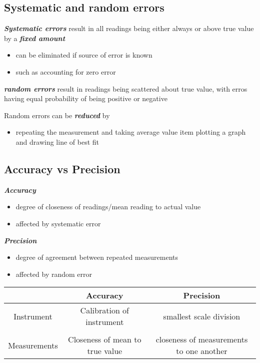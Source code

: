 \documentclass[a4paper, 10pt]{article}
\begin{document}
\subsection{Systematic and random errors}
\textbf{\textit{Systematic errors}} result in all readings being either always or above true value by a \textbf{\textit{fixed amount}}
\begin{itemize}
   \item can be eliminated if source of error is known
   \item such as accounting for zero error
\end{itemize}	


\textbf{\textit{random errors}} result in readings being scattered about true value, with erros having equal probability of being positive or negative

Random errors can be \textbf{\textit{reduced}} by 
\begin{itemize}
   \item repeating the measurement and taking average value
   item plotting a graph and drawing line of best fit
\end{itemize}	

\subsection{Accuracy vs Precision}
\textbf{\textit{Accuracy}}
\begin{itemize}
   \item degree of closeness of readings/mean reading to actual value
   \item affected by systematic error
\end{itemize}	


\textbf{\textit{Precision}}
\begin{itemize}
   \item degree of agreement between repeated measurements
   \item affected by random error
\end{itemize}	

\begin{center}
   \begin{tabular}{c|c c}
      \hline
      & Accuracy & Precision \\
      \hline
      Instrument & Calibration of instrument & smallest scale division \\ \\
      Measurements & Closeness of mean to true value & closeness of measurements to one another \\
      \hline
   \end{tabular}
\end{center}
\end{document}
